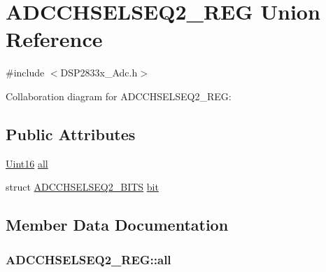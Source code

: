 \hypertarget{union_a_d_c_c_h_s_e_l_s_e_q2___r_e_g}{}\section{A\+D\+C\+C\+H\+S\+E\+L\+S\+E\+Q2\+\_\+\+R\+E\+G Union Reference}
\label{union_a_d_c_c_h_s_e_l_s_e_q2___r_e_g}


{\ttfamily \#include $<$D\+S\+P2833x\+\_\+\+Adc.\+h$>$}



Collaboration diagram for A\+D\+C\+C\+H\+S\+E\+L\+S\+E\+Q2\+\_\+\+R\+E\+G\+:
\subsection*{Public Attributes}
\begin{DoxyCompactItemize}
\item 
\hyperlink{_d_s_p2833x___device_8h_a59a9f6be4562c327cbfb4f7e8e18f08b}{Uint16} \hyperlink{union_a_d_c_c_h_s_e_l_s_e_q2___r_e_g_a5434c086d9cc7393021a474309c474ee}{all}
\item 
struct \hyperlink{struct_a_d_c_c_h_s_e_l_s_e_q2___b_i_t_s}{A\+D\+C\+C\+H\+S\+E\+L\+S\+E\+Q2\+\_\+\+B\+I\+T\+S} \hyperlink{union_a_d_c_c_h_s_e_l_s_e_q2___r_e_g_acb3e07a9ebdec865722a0c58b0c685bc}{bit}
\end{DoxyCompactItemize}


\subsection{Member Data Documentation}
\hypertarget{union_a_d_c_c_h_s_e_l_s_e_q2___r_e_g_a5434c086d9cc7393021a474309c474ee}{}
\subsubsection[{all}]{ A\+D\+C\+C\+H\+S\+E\+L\+S\+E\+Q2\+\_\+\+R\+E\+G\+::all}\label{union_a_d_c_c_h_s_e_l_s_e_q2___r_e_g_a5434c086d9cc7393021a474309c474ee}
\hypertarget{union_a_d_c_c_h_s_e_l_s_e_q2___r_e_g_acb3e07a9ebdec865722a0c58b0c685bc}{}
